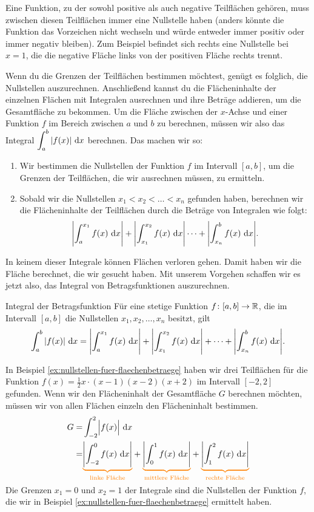 \documentclass[../../main.tex]{subfiles}
\begin{document}
Eine Funktion, zu der sowohl positive als auch negative Teilflächen gehören, muss zwischen diesen Teilflächen immer eine 
Nullstelle haben (anders könnte die Funktion das Vorzeichen nicht wechseln und würde entweder immer positiv oder immer 
negativ bleiben). Zum Beispiel befindet sich rechts eine Nullstelle bei $x=1$, die die negative Fläche links von der
positiven Fläche rechts trennt.

Wenn du die Grenzen der Teilflächen bestimmen möchtest, genügt es folglich, die Nullstellen auszurechnen. Anschließend kannst du die Flächeninhalte
der einzelnen Flächen mit Integralen ausrechnen und ihre Beträge addieren, um die Gesamtfläche zu bekommen.
Um die Fläche zwischen der $x$-Achse und einer Funktion $f$ im Bereich zwischen $a$ und $b$ zu berechnen, müssen wir 
also das Integral $\displaystyle\int_a^b|f(x)|\mathop{}\mathrm{d} x$ berechnen. Das machen wir so:
\begin{enumerate}
    \item Wir bestimmen die Nullstellen der Funktion $f$ im Intervall $[a,b]$, um die Grenzen der Teilflächen, die wir ausrechnen müssen, zu
        ermitteln.
    \item Sobald wir die Nullstellen $x_1<x_2<\dots<x_n$ gefunden haben, berechnen wir die Flächeninhalte der Teilflächen
        durch die Beträge von Integralen wie folgt:
        \[\Biggl|\int_a^{x_1}f(x)\mathop{}\mathrm{d} x\Biggr|+\Biggl|\int_{x_1}^{x_2}f(x)\mathop{}\mathrm{d} x\Biggr|\dots+\Biggl|\int_{x_n}^bf(x)\mathop{}\mathrm{d} x\Biggr|.\]
\end{enumerate}
In keinem dieser Integrale können Flächen verloren gehen. Damit haben wir die Fläche berechnet, die wir gesucht haben.
Mit unserem Vorgehen schaffen wir es jetzt also, das Integral von Betragsfunktionen auszurechnen.
\begin{theorem}{Integral der Betragsfunktion}
    Für eine stetige Funktion $f\colon[a,b]\rightarrow\mathbb{R}$, die im Intervall $[a,b]$ die Nullstellen 
    $x_1,x_2,\dots,x_n$ besitzt, gilt
    \[\int_a^b|f(x)|\mathop{}\mathrm{d} x=\Biggl|\int_a^{x_1}f(x)\mathop{}\mathrm{d} x\Biggr|+\Biggl|\int_{x_1}^{x_2}f(x)\mathop{}\mathrm{d} x\Biggr|+\dots+\Biggl|\int_{x_n}^bf(x)\mathop{}\mathrm{d} x\Biggr|.\]
\end{theorem}
\begin{example}{}
    In Beispiel \ref{ex:nullstellen-fuer-flaechenbetraege} haben wir drei Teilflächen für die Funktion $f(x)=\frac{1}{2}x\cdot (x-1)(x-2)(x+2)$
    im Intervall $[-2,2]$ gefunden. Wenn wir den Flächeninhalt der Gesamtfläche $G$ berechnen möchten, müssen wir von 
    allen Flächen einzeln den Flächeninhalt bestimmen.
    \begin{align*}
        G=&\int_{-2}^2\Bigl|f(x)\Bigr|\diff x\\
        =&\colorbrace{\Biggl|\int_{-2}^0f(x)\diff x\Biggr|}{\text{linke Fläche}}+
        \colorbrace{\Biggl|\int_{0}^1f(x)\diff x\Biggr|}{\text{mittlere Fläche}}+
        \colorbrace{\Biggl|\int_{1}^2f(x)\diff x\Biggr|}{\text{rechte Fläche}}
    \end{align*}
    Die Grenzen $x_1=0$ und $x_2=1$ der Integrale sind die Nullstellen der Funktion $f$, die wir in Beispiel 
    \ref{ex:nullstellen-fuer-flaechenbetraege} ermittelt haben.
\end{example}
\end{document}
